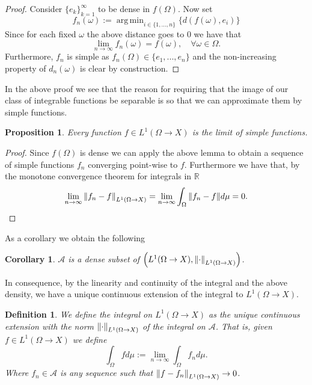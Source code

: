 \documentclass[12pt]{article}
\newtheorem{proposition}{Proposition}
\newtheorem{definition}{Definition}
\newtheorem{corollary}{Corollary}
\DeclareMathOperator*{\argmin}{arg\,min}
\begin{document}
\begin{proof}
	Consider $\{e_k\}_{k=1}^\infty$ to be dense in $f(\Omega)$. Now set
	\begin{equation*}
		f_n(\omega):= \argmin_{i\in\{1,...,n\}} \{d(f(\omega),e_i)\}
	\end{equation*}
	Since for each fixed $\omega$ the above distance goes to $0$ we have that
	\begin{equation*}
		\lim_{n\to\infty} f_n(\omega)=f(\omega),\quad \forall \omega\in\Omega.
	\end{equation*}
	Furthermore, $f_n$ is simple as $f_n(\Omega)\in \{e_1,...,e_n\}$ and the non-increasing property of $d_n(\omega)$ is clear by construction.
\end{proof}
In the above proof we see that the reason for requiring that the image of our class of integrable functions be separable is so that we can approximate them by simple functions.
\begin{proposition}
	Every function $f\in L^1(\Omega\to X)$ is the limit of simple functions.
\end{proposition}
\begin{proof}
	Since $f(\Omega)$ is dense we can apply the above lemma to obtain a sequence of simple functions $f_n$ converging point-wise to $f$. Furthermore we have that, by the monotone convergence theorem for integrals in $\mathbb{R}$
	\begin{equation*}
		\lim_{n\to\infty}\norm{f_n-f}_{L^1(\Omega\to X)}=\lim_{n\to\infty}\int_\Omega\norm{f_n-f}d\mu=0.
	\end{equation*}
\end{proof}
As a corollary we obtain the following
\begin{corollary}
	$\mathcal{A}$ is a dense subset of $\qty(L^1(\Omega\to X),\norm{\cdot}_{L^1(\Omega\to X)})$.
\end{corollary}
In consequence, by the linearity and continuity of the integral and the above density, we have a unique continuous extension of the integral to $L^1(\Omega\to X)$.
\begin{definition}
	We define the integral on $L^1(\Omega\to X)$ as the unique continuous extension with the norm $\norm{\cdot}_{L^1(\Omega\to X)}$ of the integral on $\mathcal{A}$. That is, given $f\in L^1(\Omega\to X)$ we define
	\begin{equation*}
		\int_\Omega f d\mu:=\lim_{n\to\infty} \int_\Omega f_n d\mu.
	\end{equation*}
	Where $f_n\in \mathcal{A}$ is any sequence such that $\norm{f-f_n}_{L^1(\Omega\to X)}\to 0$.
\end{definition}
\end{document}

